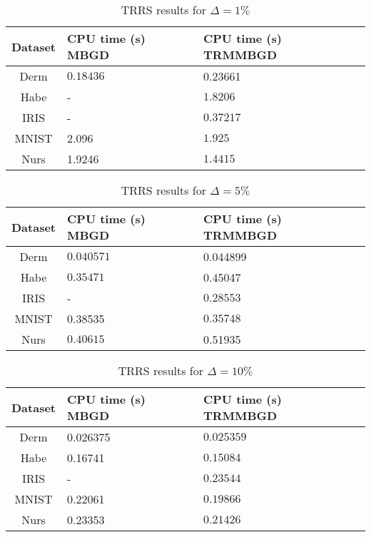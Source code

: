 \documentclass[letterpaper,12pt,titlepage,oneside,final]{book}
\begin{document}
\begin{table}[h] 
	\centering 
	\begin{tabular}{ |c|l|l| } 
		\hline 
		\textbf{Dataset} & CPU time (s) \textbf{MBGD} & CPU time (s) \textbf{TRMMBGD}\\ 
		\hline 
		Derm & $\mathbf{0.18436}$ &0.23661\\ 
		\hline 
		Habe & - & $\mathbf{1.8206}$\\ 
		\hline 
		IRIS & - & $\mathbf{0.37217}$\\ 
		\hline 
		MNIST &2.096 & $\mathbf{1.925}$\\ 
		\hline 
		Nurs &1.9246 & $\mathbf{1.4415}$\\ 
		\hline 
	\end{tabular} 
	\caption{TRRS results for $\Delta = 1 \%$} \label{TRMMBGD1} \end{table}
	
\begin{table}[h] 
	\centering 
	\begin{tabular}{ |c|l|l| } 
		\hline 
		\textbf{Dataset} & CPU time (s) \textbf{MBGD} & CPU time (s) \textbf{TRMMBGD}\\ 
		\hline 
		Derm & $\mathbf{0.040571}$ &0.044899\\ 
		\hline 
		Habe & $\mathbf{0.35471}$ &0.45047\\ 
		\hline 
		IRIS & - & $\mathbf{0.28553}$\\ 
		\hline 
		MNIST &0.38535 & $\mathbf{0.35748}$\\ 
		\hline 
		Nurs & $\mathbf{0.40615}$ &0.51935\\ 
		\hline 
	\end{tabular} 
	\caption{TRRS results for $\Delta = 5 \%$} \label{TRMMBGD5} \end{table}
	
\begin{table}[h] 
	\centering 
	\begin{tabular}{ |c|l|l| } 
		\hline 
		\textbf{Dataset} & CPU time (s) \textbf{MBGD} & CPU time (s) \textbf{TRMMBGD}\\ 
		\hline 
		Derm &0.026375 & $\mathbf{0.025359}$\\ 
		\hline 
		Habe &0.16741 & $\mathbf{0.15084}$\\ 
		\hline 
		IRIS & - & $\mathbf{0.23544}$\\ 
		\hline 
		MNIST &0.22061 & $\mathbf{0.19866}$\\ 
		\hline 
		Nurs &0.23353 & $\mathbf{0.21426}$\\ 
		\hline 
	\end{tabular} 
	\caption{TRRS results for $\Delta = 10 \%$} \label{TRMMBGD10} \end{table}
	
\end{document}
